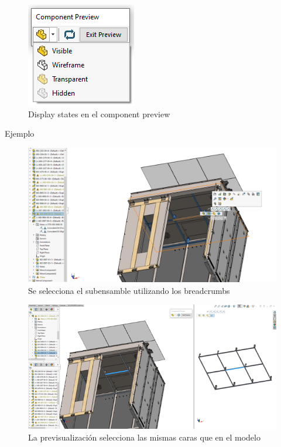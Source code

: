 \documentclass{report}
\begin{document}
\begin{figure}[H]
	\centering
	\includegraphics[width=0.45\linewidth, height=0.5\textheight,keepaspectratio]{Imagenes/solidworks_componentpreview_02}
	\caption{Display states en el component preview}
	\label{fig:solidworkscomponentpreview02}
\end{figure}

{\LARGE Ejemplo}

\begin{figure}[H]
	\centering
	\includegraphics[width=0.85\linewidth, height=0.5\textheight,keepaspectratio]{Imagenes/solidworks_componentpreview_03}
	\caption{Se selecciona el subensamble utilizando los breadcrumbs}
	\label{fig:solidworkscomponentpreview03}
\end{figure}

\begin{figure}[H]
	\centering
	\includegraphics[width=0.85\linewidth, height=0.5\textheight,keepaspectratio]{Imagenes/solidworks_componentpreview_04}
	\caption{La previsualización selecciona las mismas caras que en el modelo}
	\label{fig:solidworkscomponentpreview43}
\end{figure}
\end{document}
